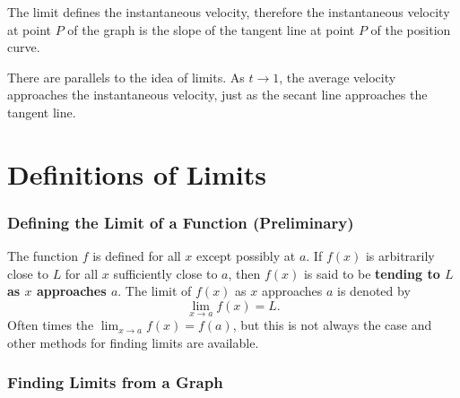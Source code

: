 \documentclass{report}
\begin{document}
The limit defines the instantaneous velocity, therefore the instantaneous velocity at point $P$ of the graph is the slope of the tangent line at point $P$ of the position curve.   

There are parallels to the idea of limits. As $t\to 1$, the average velocity approaches the instantaneous velocity, just as the secant line approaches the tangent line.

\newpage
\section{Definitions of Limits}
\subsubsection{Defining the Limit of a Function (Preliminary)} 
The function $f$ is defined for all $x$ except possibly at $a$. If $f(x)$ is arbitrarily close to $L$ for all $x$ sufficiently close to $a$, then $f(x)$ is said to be \textbf{tending to $L$ as $x$ approaches $a$}. The limit of $f(x)$ as $x$ approaches $a$ is denoted by 
\begin{equation*}
    \lim_{x\to a}f(x)=L.
\end{equation*}
Often times the $\lim_{x\to a}f(x)=f(a)$, but this is not always the case and other methods for finding limits are available.

\subsubsection{Finding Limits from a Graph}

\end{document}
